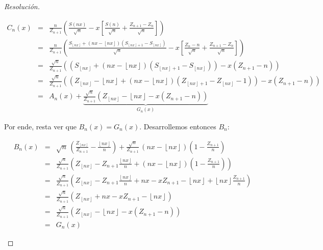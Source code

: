 \documentclass[a4paper,11pt]{article}
\newcommand{\floor}[1]{\left\lfloor #1 \right\rfloor}
\newcommand{\fnx}{\floor{nx}}
\begin{document}
\begin{proof}[Resoluci\'on]
\begin{enumerate}
    \begin{eqnarray*}
        C_n(x) &=& \frac{n}{Z_{n+1}} \left(\frac{S(nx)}{\sqrt{n}} - x \left[ \frac{S(n)}{\sqrt{n}} + \frac{Z_{n+1} - Z_n}{\sqrt{n}} \right] \right) \\
            &=& \frac{n}{Z_{n+1}} \left(\frac{S_{\floor{nx}} + (nx - \floor{nx}) (S_{\floor{nx}+1} - S_{\floor{nx}})}{\sqrt{n}} - x \left[ \frac{Z_n - n}{\sqrt{n}} + \frac{Z_{n+1} - Z_n}{\sqrt{n}} \right] \right) \\
            &=& \frac{\sqrt{n}}{Z_{n+1}} \left( \left(S_{\floor{nx}} + (nx - \floor{nx}) (S_{\floor{nx}+1} - S_{\floor{nx}})\right) - x \left( Z_{n+1} - n \right) \right) \\
            &=& \frac{\sqrt{n}}{Z_{n+1}} \left( \left(Z_{\floor{nx}} - \floor{nx} + (nx - \floor{nx}) (Z_{\floor{nx}+1} - Z_{\floor{nx}} - 1)\right) - x \left( Z_{n+1} - n \right) \right) \\
            &=& A_n(x) + \underbrace{ \frac{\sqrt{n}}{Z_{n+1}} \left(Z_{\floor{nx}} - \floor{nx}  - x \left( Z_{n+1} - n \right)\right) }_{G_n(x)}
    \end{eqnarray*}

    Por ende, resta ver que $B_n(x) = G_n(x)$. Desarrollemos entonces $B_n$:

    \begin{eqnarray*}    
        B_n(x) &=& \sqrt{n} \, \left(\frac{Z_{\fnx}}{Z_{n+1}} − \frac{\fnx}{n} \right) + \frac{\sqrt{n}}{Z_{n+1}} \, (nx - \floor{nx}) \left(1 - \frac{Z_{n+1}}{n}\right) \\
            &=& \frac{\sqrt{n}}{Z_{n+1}} \left( Z_{\fnx} - Z_{n+1} \frac{\fnx}{n} + (nx - \floor{nx}) \left(1 - \frac{Z_{n+1}}{n}\right) \right) \\
            &=& \frac{\sqrt{n}}{Z_{n+1}} \left( Z_{\fnx} - Z_{n+1} \frac{\fnx}{n} + nx - x Z_{n+1} - \fnx + \fnx \frac{Z_{n+1}}{n} \right) \\
            &=& \frac{\sqrt{n}}{Z_{n+1}} \left( Z_{\fnx} + nx - x Z_{n+1} - \fnx \right) \\
            &=& \frac{\sqrt{n}}{Z_{n+1}} \left( Z_{\fnx} - \fnx - x  (Z_{n+1} - n) \right) \\
            &=& G_n(x)
    \end{eqnarray*}


\end{enumerate}
\end{proof}
\end{document}
